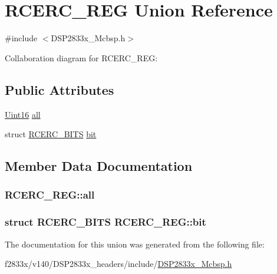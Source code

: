 \hypertarget{union_r_c_e_r_c___r_e_g}{}\section{R\+C\+E\+R\+C\+\_\+\+R\+E\+G Union Reference}
\label{union_r_c_e_r_c___r_e_g}


{\ttfamily \#include $<$D\+S\+P2833x\+\_\+\+Mcbsp.\+h$>$}



Collaboration diagram for R\+C\+E\+R\+C\+\_\+\+R\+E\+G\+:
\subsection*{Public Attributes}
\begin{DoxyCompactItemize}
\item 
\hyperlink{_d_s_p2833x___device_8h_a59a9f6be4562c327cbfb4f7e8e18f08b}{Uint16} \hyperlink{union_r_c_e_r_c___r_e_g_a5ab7190e274af8ddac88eaee9dea7482}{all}
\item 
struct \hyperlink{struct_r_c_e_r_c___b_i_t_s}{R\+C\+E\+R\+C\+\_\+\+B\+I\+T\+S} \hyperlink{union_r_c_e_r_c___r_e_g_adcbd8e2a5ea8c03490707dd6170cc7fc}{bit}
\end{DoxyCompactItemize}


\subsection{Member Data Documentation}
\hypertarget{union_r_c_e_r_c___r_e_g_a5ab7190e274af8ddac88eaee9dea7482}{}
\subsubsection[{all}]{ R\+C\+E\+R\+C\+\_\+\+R\+E\+G\+::all}\label{union_r_c_e_r_c___r_e_g_a5ab7190e274af8ddac88eaee9dea7482}
\hypertarget{union_r_c_e_r_c___r_e_g_adcbd8e2a5ea8c03490707dd6170cc7fc}{}
\subsubsection[{bit}]{\setlength{\rightskip}{0pt plus 5cm}struct {\bf R\+C\+E\+R\+C\+\_\+\+B\+I\+T\+S} R\+C\+E\+R\+C\+\_\+\+R\+E\+G\+::bit}\label{union_r_c_e_r_c___r_e_g_adcbd8e2a5ea8c03490707dd6170cc7fc}


The documentation for this union was generated from the following file\+:\begin{DoxyCompactItemize}
\item 
f2833x/v140/\+D\+S\+P2833x\+\_\+headers/include/\hyperlink{_d_s_p2833x___mcbsp_8h}{D\+S\+P2833x\+\_\+\+Mcbsp.\+h}\end{DoxyCompactItemize}
